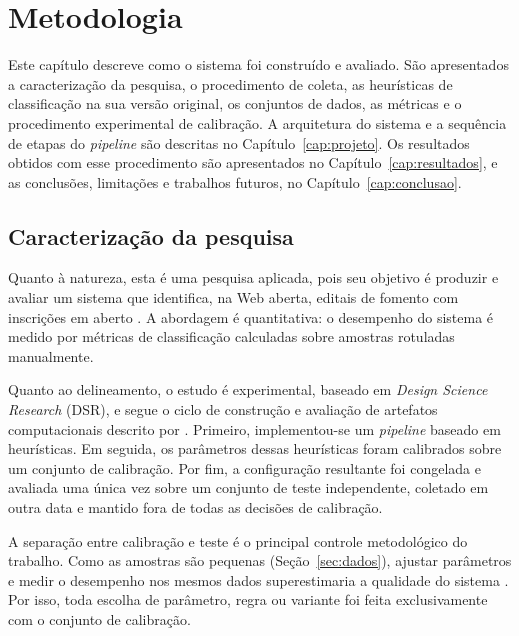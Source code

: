 \chapter[METODOLOGIA]{Metodologia}
\label{cap:metodologia}

Este capítulo descreve como o sistema foi construído e avaliado. São
apresentados a caracterização da pesquisa, o procedimento de coleta, as
heurísticas de classificação na sua versão original, os conjuntos de dados, as
métricas e o procedimento experimental de calibração. A arquitetura do sistema
e a sequência de etapas do \textit{pipeline} são descritas no
Capítulo~\ref{cap:projeto}. Os resultados obtidos com esse procedimento são
apresentados no Capítulo~\ref{cap:resultados}, e as conclusões, limitações e
trabalhos futuros, no Capítulo~\ref{cap:conclusao}.

\section{Caracterização da pesquisa}
\label{sec:caracterizacao}

Quanto à natureza, esta é uma pesquisa aplicada, pois seu objetivo é produzir e
avaliar um sistema que identifica, na Web aberta, editais de fomento com
inscrições em aberto \cite{gil2017}. A abordagem é quantitativa: o desempenho do
sistema é medido por métricas de classificação calculadas sobre amostras
rotuladas manualmente.

Quanto ao delineamento, o estudo é experimental, baseado em \textit{Design Science Research} (DSR), e segue o ciclo de construção e
avaliação de artefatos computacionais descrito por
. Primeiro, implementou-se um \textit{pipeline} baseado em
heurísticas. Em seguida, os parâmetros dessas heurísticas foram calibrados
sobre um conjunto de calibração. Por fim, a configuração resultante foi
congelada e avaliada uma única vez sobre um conjunto de teste independente,
coletado em outra data e mantido fora de todas as decisões de calibração.

A separação entre calibração e teste é o principal controle metodológico do
trabalho. Como as amostras são pequenas (Seção~\ref{sec:dados}), ajustar
parâmetros e medir o desempenho nos mesmos dados superestimaria a qualidade do
sistema \cite{cawley2010}. Por isso, toda escolha de parâmetro, regra ou
variante foi feita exclusivamente com o conjunto de calibração.

